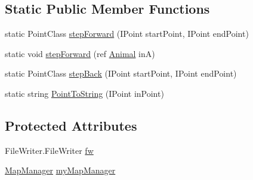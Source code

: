 \subsection*{Static Public Member Functions}
\begin{DoxyCompactItemize}
\item 
static Point\-Class \hyperlink{class_p_a_z___dispersal_1_1_mover_ad09a4ce3ef8c8d3d2fc5e6419d221cc6}{step\-Forward} (I\-Point start\-Point, I\-Point end\-Point)
\item 
static void \hyperlink{class_p_a_z___dispersal_1_1_mover_ab06ea24d2d1e9e38da3774b2a68ca60f}{step\-Forward} (ref \hyperlink{class_p_a_z___dispersal_1_1_animal}{Animal} in\-A)
\item 
static Point\-Class \hyperlink{class_p_a_z___dispersal_1_1_mover_ab0b1982a574eef1234167df3c87172f0}{step\-Back} (I\-Point start\-Point, I\-Point end\-Point)
\item 
static string \hyperlink{class_p_a_z___dispersal_1_1_mover_a9568b8eb271954ed3a3a8b2e028e540d}{Point\-To\-String} (I\-Point in\-Point)
\end{DoxyCompactItemize}
\subsection*{Protected Attributes}
\begin{DoxyCompactItemize}
\item 
File\-Writer.\-File\-Writer \hyperlink{class_p_a_z___dispersal_1_1_mover_a291435da8eb2172fd4e6378be81ea7a7}{fw}
\item 
\hyperlink{class_p_a_z___dispersal_1_1_map_manager}{Map\-Manager} \hyperlink{class_p_a_z___dispersal_1_1_mover_a1fceb93669a9821630e1704c44f9e8fc}{my\-Map\-Manager}
\end{DoxyCompactItemize}

